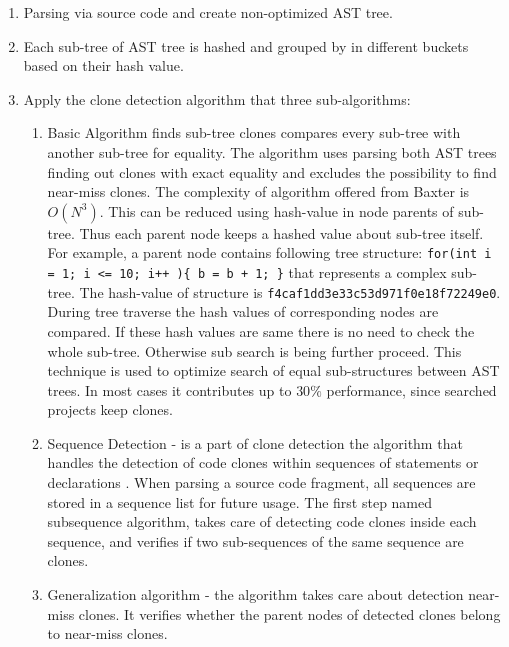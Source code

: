 \documentclass{report}
\begin{document}
\begin{enumerate}
	\item Parsing via source code and create non-optimized AST tree.
	\item Each sub-tree of AST tree is hashed and grouped by in different buckets based on their hash value. 
	\item Apply the clone detection algorithm that three sub-algorithms:
		\begin{enumerate}[label*=\arabic*.]
		\item Basic Algorithm finds sub-tree clones compares every sub-tree with another sub-tree for equality. The algorithm uses parsing both AST trees finding out clones with exact equality and excludes the possibility to find near-miss clones. The complexity of algorithm offered from Baxter \cite{baxter} is 
$ O(N^3)$. This can be reduced using hash-value in node parents of sub-tree. Thus each parent node keeps a hashed value about sub-tree itself. For example, a parent node contains following tree structure: \texttt{for(int i = 1; i <= 10; i++ )\{ b = b + 1; \}} that represents a complex sub-tree. The hash-value of structure is \texttt{f4caf1dd3e33c53d971f0e18f72249e0}. During tree traverse the hash values of corresponding nodes are compared. If these hash values are same there is no need to check the whole sub-tree. Otherwise sub search is being further proceed. This technique is used to optimize search of equal sub-structures between AST trees. In most cases it contributes up to $30\%$ performance, since searched projects keep clones.
		\item Sequence Detection - is a part of clone detection the algorithm that handles the detection of code clones within sequences of statements or declarations \cite{flavius}. When parsing a source code fragment, all sequences are stored in a sequence list for future usage. The first step named subsequence algorithm, takes care of detecting code clones inside each sequence, and verifies if two sub-sequences of the same sequence are clones.	
		\item Generalization algorithm - the algorithm takes care about detection near-miss clones. It verifies whether the parent nodes of detected clones belong to near-miss clones.
		 \end{enumerate} 
\end{enumerate}
\end{document}
